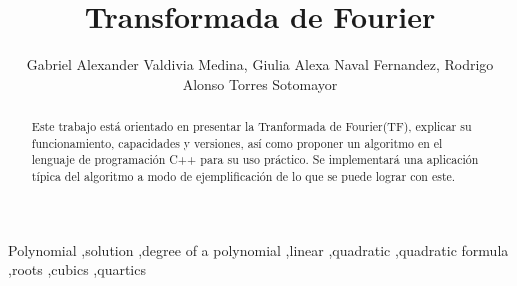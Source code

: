 \documentclass[preprint,review,12pt]{elsarticle}
\begin{document}
\begin{frontmatter}


\title{Transformada de Fourier}




\author{Gabriel Alexander Valdivia Medina, Giulia Alexa Naval Fernandez, Rodrigo Alonso Torres Sotomayor}

\address{Universidad Católica San Pablo, Arequipa.}

\begin{abstract}
Este trabajo está orientado en presentar la Tranformada de Fourier(TF),
explicar su funcionamiento, capacidades y versiones, así como proponer un
algoritmo en el lenguaje de programación C++ para su uso práctico. Se implementará 
una aplicación típica del algoritmo a modo de ejemplificación de lo que se puede
lograr con este. 
\end{abstract}

\begin{keyword}
Polynomial \sep solution \sep degree of a polynomial \sep linear 
\sep quadratic \sep quadratic formula \sep roots \sep cubics \sep quartics


\end{keyword}

\end{frontmatter}

\end{document}

